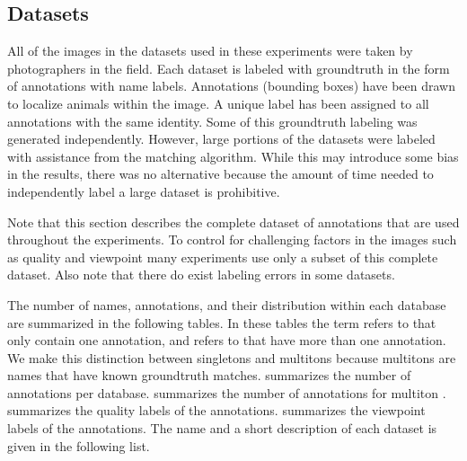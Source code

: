     \subsection{Datasets}\label{sub:datasets}

        All of the images in the datasets used in these experiments
          were taken by photographers in the field.
        Each dataset is labeled with groundtruth in the form of
          annotations with name labels.
        Annotations (bounding boxes) have been drawn to localize
          animals within the image.
        A unique \name{} label has been assigned to all annotations
          with the same identity.
        Some of this groundtruth labeling was generated independently.
        However, large portions of the datasets were labeled with
          assistance from the matching algorithm.
        While this may introduce some bias in the results, there was no
          alternative because the amount of time needed to independently
          label a large dataset is prohibitive.

        Note that this section describes the complete dataset of
          annotations that are used throughout the experiments.
        To control for challenging factors in the images such as
          quality and viewpoint many experiments use only a subset of
          this complete dataset.
        Also note that there do exist labeling errors in some datasets.

        \DatabaseInfo{}

        \timedist{}

        The number of names, annotations, and their distribution within
          each database are summarized in the following tables.
        In these tables the term  refers to
          \names{} that only contain one annotation, and
           refers to \names{} that have more than one
          annotation.
        We make this distinction between singletons and multitons
          because multitons are names that have known groundtruth
          matches.
         summarizes the number of
          annotations per database.
         summarizes the number of
          annotations for multiton \names{}.
         summarizes the quality labels
          of the annotations.
         summarizes the viewpoint
          labels of the annotations.
        The name and a short description of each dataset is given in
          the following list.


